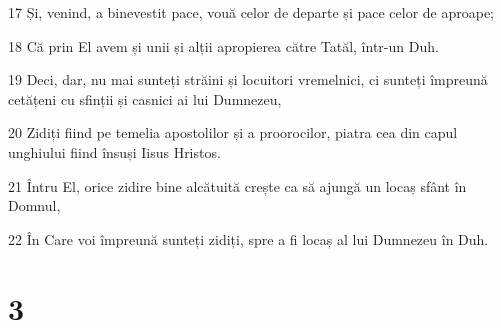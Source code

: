 \par 17 Și, venind, a binevestit pace, vouă celor de departe și pace celor de aproape;
\par 18 Că prin El avem și unii și alții apropierea către Tatăl, într-un Duh.
\par 19 Deci, dar, nu mai sunteți străini și locuitori vremelnici, ci sunteți împreună cetățeni cu sfinții și casnici ai lui Dumnezeu,
\par 20 Zidiți fiind pe temelia apostolilor și a proorocilor, piatra cea din capul unghiului fiind însuși Iisus Hristos.
\par 21 Întru El, orice zidire bine alcătuită crește ca să ajungă un locaș sfânt în Domnul,
\par 22 În Care voi împreună sunteți zidiți, spre a fi locaș al lui Dumnezeu în Duh.

\chapter{3}

